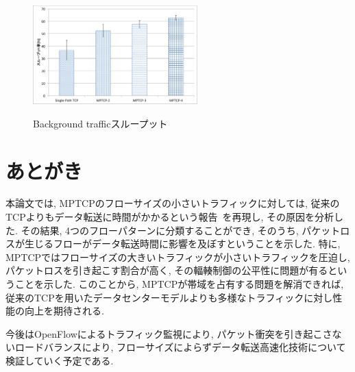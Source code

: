 \documentclass[technicalreport]{ieicej}
\begin{document}
\begin{figure}[h]
    \begin{center}
    \includegraphics[autoebb, width=180pt]{./img/back.pdf}
    \caption{Background trafficスループット}
    \label{fig:background}
    \end{center}
\end{figure}
\hspace{1cm}

\section{あとがき}
\label{sec:conclude}
本論文では, MPTCPのフローサイズの小さいトラフィックに対しては,
従来のTCPよりもデータ転送に時間がかかるという報告~\cite{improving}を再現し, その原因を分析した.
その結果, 4つのフローパターンに分類することができ, そのうち, パケットロスが生じるフローがデータ転送時間に影響を及ぼすということを示した.
特に, MPTCPではフローサイズの大きいトラフィックが小さいトラフィックを圧迫し, パケットロスを引き起こす割合が高く,
その輻輳制御の公平性に問題が有るということを示した.
このことから, MPTCPが帯域を占有する問題を解消できれば, 従来のTCPを用いたデータセンターモデルよりも多様なトラフィックに対し性能の向上を期待される.

今後はOpenFlowによるトラフィック監視により, パケット衝突を引き起こさないロードバランスにより,
フローサイズによらずデータ転送高速化技術について検証していく予定である.
\end{document}

